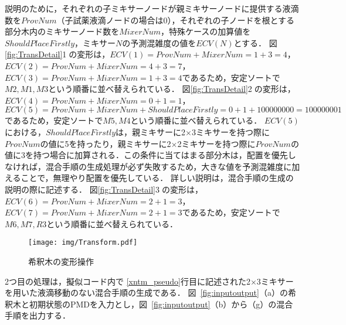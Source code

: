 説明のために，それぞれの子ミキサーノードが親ミキサーノードに提供する液滴数を$\mathit{ProvNum}$（子試薬液滴ノードの場合は0），それぞれの子ノードを根とする部分木内のミキサーノード数を$\mathit{MixerNum}$，特殊ケースの加算値を$\mathit{ShouldPlaceFirstly}$，ミキサー$N$の予測混雑度の値を$ECV(N)$とする．
図\ref{fig:TransDetail}\textcircled{\scriptsize 1}の変形は，$ECV(1)=ProvNum+MixerNum=1+3=4$，$ECV(2)=ProvNum+MixerNum=4+3=7$，$ECV(3)=ProvNum+MixerNum=1+3=4$であるため，安定ソートで$M2,M1,M3$という順番に並べ替えられている．
図\ref{fig:TransDetail}\textcircled{\scriptsize 2}の変形は，$ECV(4)=ProvNum+MixerNum=0+1=1$，$ECV(5)=ProvNum+MixerNum+ShouldPlaceFirstly=0+1+100000000=100000001$であるため，安定ソートで$M5,M4$という順番に並べ替えられている．
$ECV(5)$における，$\mathit{ShouldPlaceFirstly}$は，親ミキサーに2$\times$3ミキサーを持つ際に$ProvNum$の値に5を持ったり，親ミキサーに2$\times$2ミキサーを持つ際に$ProvNum$の値に3を持つ場合に加算される．この条件に当てはまる部分木は，配置を優先しなければ，混合手順の生成処理が必ず失敗するため，大きな値を予測混雑度に加えることで，無理やり配置を優先している．
詳しい説明は，混合手順の生成の説明の際に記述する．
図\ref{fig:TransDetail}\textcircled{\scriptsize 3}の変形は，$ECV(6)=ProvNum+MixerNum=2+1=3$，$ECV(7)=ProvNum+MixerNum=2+1=3$であるため，安定ソートで$M6,M7,R3$という順番に並べ替えられている．

\begin{figure}[tbp]
 \centering\texttt{[image: img/Transform.pdf]}
 \caption{希釈木の変形操作}\label{fig:Transform}
\end{figure}


2つ目の処理は，擬似コード内で
\ref{xntm_pseudo}行目に記述された2$\times$3ミキサーを用いた液滴移動のない混合手順の生成である．
図~\ref{fig:inputoutput}（a）の希釈木と初期状態のPMDを入力とし，図~\ref{fig:inputoutput}（b）から（g）の混合手順を出力する．



